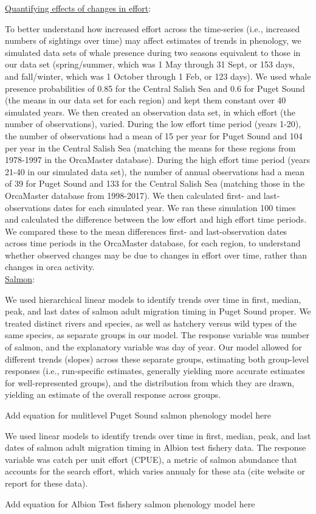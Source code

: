 \documentclass{article}
\begin{document}
\underline{Quantifying effects of changes in effort}:
\par To better understand how increased effort across the time-series (i.e., increased numbers of sightings over time) may affect estimates of trends in phenology, we simulated data sets of whale presence during two seasons equivalent to those in our data set (spring/summer, which was 1 May through 31 Sept, or 153 days, and fall/winter, which was 1 October through 1 Feb, or 123 days). We used whale presence probabilities of 0.85 for the Central Salish Sea and 0.6 for Puget Sound (the means in our data set for each region) and kept them constant over 40 simulated years. We then created an observation data set, in which effort (the number of observations), varied. During the low effort time period (years 1-20), the number of observations had a mean of 15 per year for Puget Sound and 104 per year in the Central Salish Sea (matching the means for these regions from 1978-1997 in the OrcaMaster database).  During the high effort time period (years 21-40 in our simulated data set), the number of annual observations had a mean of 39 for Puget Sound and 133 for the Central Salish Sea (matching those in the OrcaMaster database from 1998-2017). We then calculated first- and last- observations dates for each simulated year. We ran these simulation 100 times and calculated the difference between the low effort and high effort time periods. We compared these to the mean differences first- and last-observation dates across time periods in the OrcaMaster database, for each region, to understand whether observed changes may be due to changes in effort over time, rather than changes in orca activity.\\
\underline{Salmon}:
\par We used hierarchical linear models to identify trends over time in first, median, peak, and last dates of salmon adult migration timing in Puget Sound proper. We treated distinct rivers and species, as well as hatchery versus wild types of the same species, as separate groups in our model. The response variable was number of salmon, and the explanatory variable was day of year. Our model allowed for different trends (slopes) across these separate groups, estimating both group-level responses (i.e., run-specific estimates, generally yielding more accurate estimates for well-represented groups), and the distribution from which they are drawn, yielding an estimate of the overall response across groups.
\par Add equation for mulitlevel Puget Sound salmon phenology model here
\par We used linear models to identify trends over time in first, median, peak, and last dates of salmon adult migration timing in Albion test fishery data. The response variable was catch per unit effort (CPUE), a metric of salmon abundance that accounts for the search effort, which varies annualy for these ata (cite website or report for these data).
\par Add equation for Albion Test fishery salmon phenology model here
\end{document}

